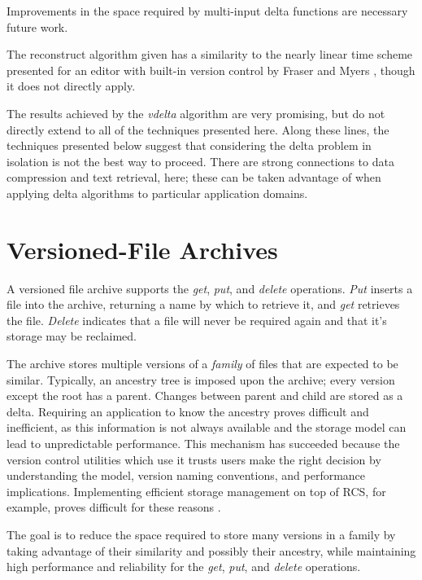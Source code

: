 \documentclass{llncs}
\begin{document}
Improvements in the space required by multi-input delta functions are
necessary future work.

The reconstruct algorithm given has a similarity to the nearly linear
time scheme presented for an editor with built-in version control by
Fraser and Myers \cite{Myers:Editor}, though it does not directly
apply.

The results achieved by the \emph{vdelta} algorithm are very
promising, but do not directly extend to all of the techniques
presented here.  Along these lines, the techniques presented below
suggest that considering the delta problem in isolation is not the
best way to proceed.  There are strong connections to data compression
and text retrieval, here; these can be taken advantage of when
applying delta algorithms to particular application domains.

\section{Versioned-File Archives}\label{sec:archival}

A versioned file archive supports the \emph{get}, \emph{put}, and
\emph{delete} operations.  \emph{Put} inserts a file into the archive,
returning a name by which to retrieve it, and \emph{get} retrieves the
file.  \emph{Delete} indicates that a file will never be required
again and that it's storage may be reclaimed.

The archive stores multiple versions of a \emph{family} of files that
are expected to be similar.  Typically, an ancestry tree is imposed
upon the archive; every version except the root has a parent.  Changes
between parent and child are stored as a delta.  Requiring an
application to know the ancestry proves difficult and inefficient, as
this information is not always available and the storage model can
lead to unpredictable performance.  This mechanism has succeeded
because the version control utilities which use it trusts users make
the right decision by understanding the model, version naming
conventions, and performance implications.  Implementing efficient
storage management on top of RCS, for example, proves difficult for
these reasons \cite{MacDonald:1998:SCM}.

The goal is to reduce the space required to store many versions in a
family by taking advantage of their similarity and possibly their
ancestry, while maintaining high performance and reliability for the
\emph{get}, \emph{put}, and \emph{delete} operations.
\end{document}

